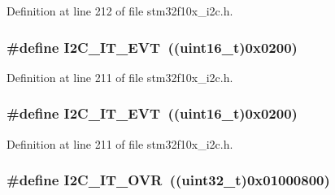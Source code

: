 Definition at line 212 of file stm32f10x\+\_\+i2c.\+h.

\subsubsection[{\texorpdfstring{I2\+C\+\_\+\+I\+T\+\_\+\+E\+VT}{I2C_IT_EVT}}]{\setlength{\rightskip}{0pt plus 5cm}\#define I2\+C\+\_\+\+I\+T\+\_\+\+E\+VT~(({\bf uint16\+\_\+t})0x0200)}\hypertarget{group___i2_c__interrupts__definition_gadd59efa313e1598a084a1e5ec3905b02}{}\label{group___i2_c__interrupts__definition_gadd59efa313e1598a084a1e5ec3905b02}


Definition at line 211 of file stm32f10x\+\_\+i2c.\+h.

\subsubsection[{\texorpdfstring{I2\+C\+\_\+\+I\+T\+\_\+\+E\+VT}{I2C_IT_EVT}}]{\setlength{\rightskip}{0pt plus 5cm}\#define I2\+C\+\_\+\+I\+T\+\_\+\+E\+VT~(({\bf uint16\+\_\+t})0x0200)}\hypertarget{group___i2_c__interrupts__definition_gadd59efa313e1598a084a1e5ec3905b02}{}\label{group___i2_c__interrupts__definition_gadd59efa313e1598a084a1e5ec3905b02}


Definition at line 211 of file stm32f10x\+\_\+i2c.\+h.

\subsubsection[{\texorpdfstring{I2\+C\+\_\+\+I\+T\+\_\+\+O\+VR}{I2C_IT_OVR}}]{\setlength{\rightskip}{0pt plus 5cm}\#define I2\+C\+\_\+\+I\+T\+\_\+\+O\+VR~(({\bf uint32\+\_\+t})0x01000800)}\hypertarget{group___i2_c__interrupts__definition_ga8e1e9e73d9057ccfce3493b5cf672833}{}\label{group___i2_c__interrupts__definition_ga8e1e9e73d9057ccfce3493b5cf672833}


